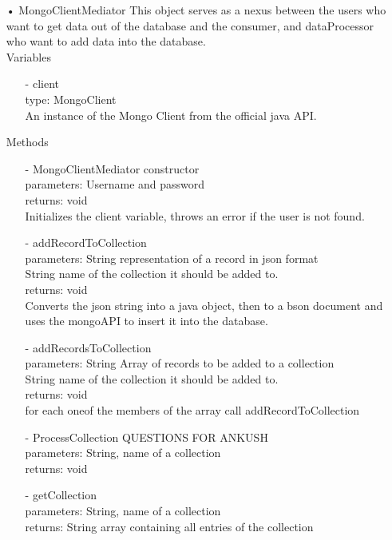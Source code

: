 \documentclass[twoside, english, draft]{design}
\begin{document}
\begin{itemize}
	
	\item[•]MongoClientMediator
	This object serves as a nexus between the users who want to get data out of the database and the consumer, and dataProcessor who want to add data into the database.
	\\Variables
	\begin{itemize}
			\item[-] client
			\\type: MongoClient
			\\ An instance of the Mongo Client from the official java API.
	\end{itemize}
	Methods
	\begin{itemize}
			\item[-]MongoClientMediator constructor
			\\parameters: Username and password
			\\returns: void
			\\Initializes the client variable, throws an error if the user is not found.
			\item[-]addRecordToCollection
			\\parameters: String representation of a record in json format
			\\String name of the collection it should be added to.
			\\returns: void
			\\Converts the json string into a java object, then to a bson document and uses the mongoAPI to insert it into the database.
			
			\item[-]addRecordsToCollection
			\\parameters: String Array of records to be added to a collection
			\\String name of the collection it should be added to.
			\\returns: void
			\\for each oneof the members of the array call addRecordToCollection
			
			\item[-]ProcessCollection QUESTIONS FOR ANKUSH
			\\parameters: String, name of a collection
			\\returns: void

			\item[-]getCollection 
			\\parameters: String, name of a collection
			\\returns: String array containing all entries of the collection
			

\end{itemize}
\end{itemize}
\end{document}
